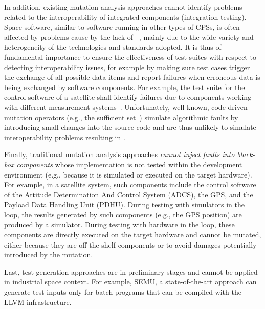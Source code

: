 In addition, existing mutation analysis approaches cannot identify problems related to the interoperability of integrated components (integration testing).
Space software, similar to software running in other types of CPSs, is often affected by problems cause by the lack of  ~\cite{Givehchi:2017,Jirkovsk:2017}, mainly due to the wide variety and heterogeneity of the technologies and standards adopted.
It is thus of fundamental importance to ensure the effectiveness of test suites with respect to detecting interoperability issues, for example by making sure test cases trigger the exchange of all possible data items and report failures when erroneous data is being exchanged by software components. For example, the test suite for the control software of a satellite shall identify failures due to components working with different measurement systems~\cite{MarsClimateOrbiter}.
Unfortunately, well known, code-driven mutation operators (e.g., the sufficient set~\cite{delamaro2014designing,delamaro2014experimental}) simulate algorithmic faults by introducing small changes into the source code and are thus unlikely to simulate interoperability problems resulting in . 

Finally, traditional mutation analysis approaches  \emph{cannot inject faults into black-box components} whose implementation is not tested within the development environment (e.g., because it is simulated or executed on the target hardware).
For example, in a satellite system, such components include the control software of the Attitude Determination And Control System (ADCS), the GPS, and the Payload Data Handling Unit (PDHU). During testing with simulators in the loop, the results generated by such components (e.g., the GPS position) are produced by a simulator. During testing with hardware in the loop, these components are directly executed on the target hardware and cannot be mutated, either because they are off-the-shelf components 
or to avoid damages potentially introduced by the mutation.

Last, test generation approaches are in preliminary stages and cannot be applied in industrial space context. For example, SEMU, a state-of-the-art approach can generate test inputs only for batch programs that can be compiled with the LLVM infrastructure.

